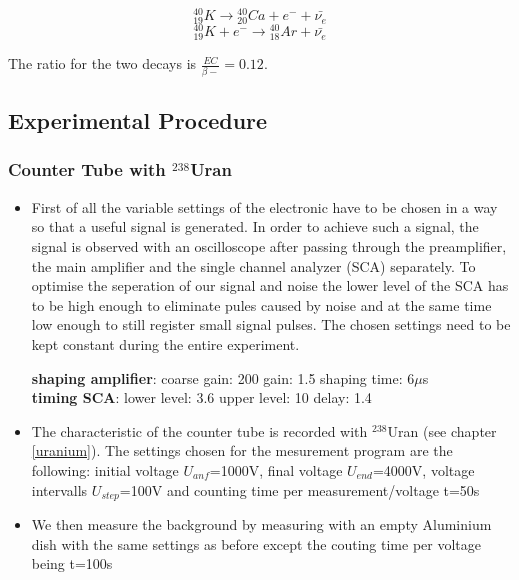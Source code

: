 \documentclass[12pt]{article}
\begin{document}
\[{}^{40}_{19}K \rightarrow {}^{40}_{20}Ca + e^- + \bar{\nu_e}\]
\[{}^{40}_{19}K + e^- \rightarrow {}^{40}_{18}Ar + \bar{\nu_e}\]

The ratio for the two decays is $\frac{EC}{\beta-}=0.12$.\\

\subsection{Experimental Procedure}

\subsubsection{Counter Tube with ${}^{238}$Uran}\label{durchfuehrunguran}
\begin{itemize}
	\item First of all the variable settings of the electronic have to be chosen in a way so that a useful signal is generated. In order to achieve such a signal, the signal is observed with an oscilloscope after passing through the preamplifier, the main amplifier and the single channel analyzer (SCA) separately. To optimise the seperation of our signal and noise the lower level of the SCA has to be high enough to eliminate pules caused by noise and at the same time low enough to still register small signal pulses. The chosen settings need to be kept constant during the entire experiment.
	
		\textbf{shaping amplifier}: coarse gain: 200 \hspace{1.5cm} gain: 1.5 \hspace{1cm} shaping time: 6$\mu$s\\
		\textbf{timing SCA}: \hspace{1cm} lower level: 3.6 \hspace{0.5cm} upper level: 10 \hspace{2.5cm} delay: 1.4
	
	\item The characteristic of the counter tube is recorded with ${}^{238}$Uran (see chapter \ref{uranium}). The settings chosen for the mesurement program are the following: initial voltage $U_{anf}$=1000V, final voltage $U_{end}$=4000V, voltage intervalls $U_{step}$=100V and counting time per measurement/voltage t=50s
	
	\item We then measure the background by measuring with an empty Aluminium dish with the same settings as before except the couting time per voltage being t=100s
\end{itemize}
\end{document}
